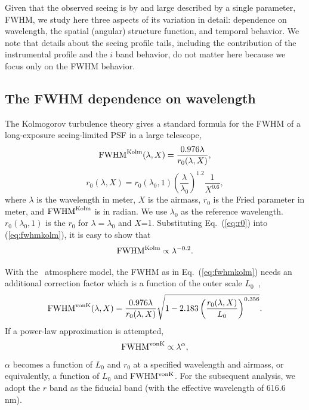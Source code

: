 

Given that the observed seeing is by and large described by a single parameter, FWHM, 
we study here three aspects of its variation in detail: dependence on wavelength,
the spatial (angular) structure function, and temporal behavior. We note that details 
about the seeing profile tails, including the contribution of the instrumental profile and
the $i$ band behavior, do not matter here because we focus only on the FWHM behavior. 

\subsection{The FWHM dependence on wavelength} 

The Kolmogorov turbulence theory gives a standard formula for the FWHM of a long-exposure
seeing-limited PSF in a large telescope,
\begin{equation}
\textrm{FWHM}^{\rm Kolm}(\lambda, X) = \frac{0.976\lambda}{r_0(\lambda,X)},
\label{eq:fwhmkolm}
\end{equation}
\begin{equation}
r_0(\lambda,X) = r_0(\lambda_0, 1) \left(\frac{\lambda}{\lambda_0}\right)^{1.2}
\frac{1}{X^{0.6}},
\label{eq:r0}
\end{equation}
where $\lambda$ is the wavelength in meter, $X$ is the airmass,
$r_0$ is the Fried parameter in meter, and $\textrm{FWHM}^{\rm Kolm}$
is in radian.
We use $\lambda_0$ as the reference wavelength.
$r_0(\lambda_0, 1)$ is the $r_0$ for $\lambda=\lambda_0$ and $X$=1.
Substituting Eq.~(\ref{eq:r0}) into (\ref{eq:fwhmkolm}), it is easy to show that 
\begin{equation}
\textrm{FWHM}^{\rm Kolm} \propto \lambda^{-0.2}.
\end{equation}


With the \vk~atmosphere model, the FWHM as in
Eq.~(\ref{eq:fwhmkolm}) needs an additional correction factor
which is a function of the outer scale $L_0$~\citep{Tokovinin2002},
\begin{equation}
\label{eq:FWHMvK}
\textrm{FWHM}^{\rm vonK}(\lambda, X) = \frac{0.976\lambda}{r_0(\lambda,X)}
\sqrt{1-2.183\left( \frac{r_0(\lambda,X) }{L_0} \right)^{0.356}}.
\end{equation}
If a power-law approximation is attempted,  
\begin{equation}
\textrm{FWHM}^{\rm vonK} \propto \lambda^{\alpha},
\label{eq:fwhmvonk} 
\end{equation}
$\alpha$ becomes a function of $L_0$ and $r_0$ at a specified
wavelength and airmass, or equivalently, a function of $L_0$ and FWHM$^{\rm vonK}$.
For the subsequent analysis, we adopt the $r$ band as the fiducial band (with
the effective wavelength of 616.6 nm).


